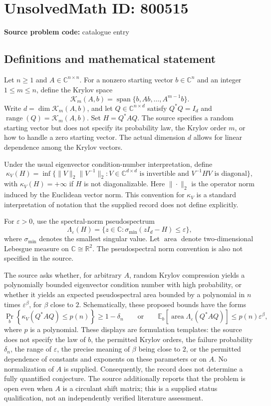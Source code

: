 \documentclass[11pt]{article}
\newcommand{\R}{\mathbb{R}}
\newcommand{\C}{\mathbb{C}}
\newcommand{\E}{\mathbb{E}}
\begin{document}
\section*{UnsolvedMath ID: 800515}
\textbf{Source problem code:} catalogue entry
\subsection{Definitions and mathematical statement}
Let \(n\geq 1\) and \(A\in\C^{n\times n}\). For a nonzero starting vector \(b\in\C^n\) and an integer \(1\leq m\leq n\), define the Krylov space
\[
\mathcal K_m(A,b)=\operatorname{span}\{b,Ab,\ldots,A^{m-1}b\}.
\]
Write \(d=\dim\mathcal K_m(A,b)\), and let \(Q\in\C^{n\times d}\) satisfy \(Q^*Q=I_d\) and \(\operatorname{range}(Q)=\mathcal K_m(A,b)\). Set \(H=Q^*AQ\). The source specifies a random starting vector but does not specify its probability law, the Krylov order \(m\), or how to handle a zero starting vector. The actual dimension \(d\) allows for linear dependence among the Krylov vectors.

Under the usual eigenvector condition-number interpretation, define
\[
\kappa_V(H)=\inf\bigl\{\|V\|_2\|V^{-1}\|_2: V\in\C^{d\times d}\text{ is invertible and }V^{-1}HV\text{ is diagonal}\bigr\},
\]
with \(\kappa_V(H)=+\infty\) if \(H\) is not diagonalizable. Here \(\|\cdot\|_2\) is the operator norm induced by the Euclidean vector norm. This convention for \(\kappa_V\) is a standard interpretation of notation that the supplied record does not define explicitly.

For \(\varepsilon>0\), use the spectral-norm pseudospectrum
\[
\Lambda_\varepsilon(H)=\{z\in\C:\sigma_{\min}(zI_d-H)\leq\varepsilon\},
\]
where \(\sigma_{\min}\) denotes the smallest singular value. Let \(\operatorname{area}\) denote two-dimensional Lebesgue measure on \(\C\cong\R^2\). The pseudospectral norm convention is also not specified in the source.

The source asks whether, for arbitrary \(A\), random Krylov compression yields a polynomially bounded eigenvector condition number with high probability, or whether it yields an expected pseudospectral area bounded by a polynomial in \(n\) times \(\varepsilon^\beta\), for \(\beta\) close to \(2\). Schematically, these proposed bounds have the forms
\[
\Pr_b\!\left\{\kappa_V(Q^*AQ)\leq p(n)\right\}\geq 1-\delta_n
\qquad\text{or}\qquad
\E_b\!\left[\operatorname{area}\Lambda_\varepsilon(Q^*AQ)\right]\leq p(n)\varepsilon^\beta,
\]
where \(p\) is a polynomial. These displays are formulation templates: the source does not specify the law of \(b\), the permitted Krylov orders, the failure probability \(\delta_n\), the range of \(\varepsilon\), the precise meaning of \(\beta\) being close to \(2\), or the permitted dependence of constants and exponents on these parameters or on \(A\). No normalization of \(A\) is supplied. Consequently, the record does not determine a fully quantified conjecture. The source additionally reports that the problem is open even when \(A\) is a circulant shift matrix; this is a supplied status qualification, not an independently verified literature assessment.
\end{document}
